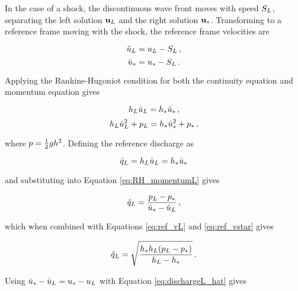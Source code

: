 In the case of a shock, the discontinuous wave front moves with speed
$S_L$, separating the left solution $\mathbf{u}_L$ and the right
solution $\mathbf{u}_*$. Transforming to a reference frame moving with the
shock, the reference frame velocities are

\begin{equation}\label{eq:ref_vL}
  \hat{u}_L = u_L - S_L \,,
\end{equation}
\begin{equation}\label{eq:ref_vstar}
  \hat{u}_* = u_* - S_L \,.
\end{equation}

Applying the Rankine-Hugoniot condition for both the continuity equation and
momentum equation gives

\begin{equation}
  h_L\hat{u}_L = h_*\hat{u}_* \,,
\end{equation}
\begin{equation}\label{eq:RH_momentumL}
  h_L\hat{u}_L^2 + p_L
    = h_*\hat{u}_*^2 + p_*
    \,,
\end{equation}

where $p = \frac{1}{2}gh^2$.
Defining the reference discharge as

\begin{equation}
  \hat{q}_L = h_L\hat{u}_L = h_*\hat{u}_*
\end{equation}

and substituting into Equation \eqref{eq:RH_momentumL} gives

\begin{equation}\label{eq:dischargeL_hat}
  \hat{q}_L = \frac{p_L - p_*}
    {\hat{u}_* - \hat{u}_L}
    \,,
\end{equation}

which when combined with Equations \eqref{eq:ref_vL} and \eqref{eq:ref_vstar}
gives

\begin{equation}\label{eq:dischargeL_h}
  \hat{q}_L = \sqrt{\frac{h_*h_L
    (p_L - p_*)}
    {h_L - h_*}}
    \,.
\end{equation}

Using $\hat{u}_* - \hat{u}_L = u_* - u_L$
with Equation \eqref{eq:dischargeL_hat} gives

